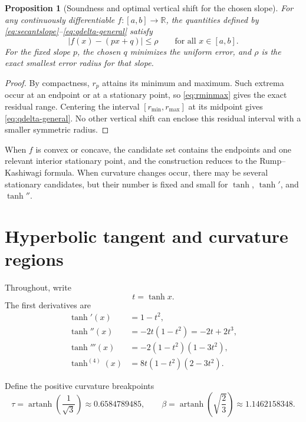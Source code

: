 \documentclass[11pt]{article}
\newtheorem{proposition}{Proposition}
\newcommand{\R}{\mathbb{R}}
\newcommand{\artanh}{\operatorname{artanh}}
\begin{document}
\begin{proposition}[Soundness and optimal vertical shift for the chosen slope]\label{prop:sound}
For any continuously differentiable \(f:[a,b]\to\R\), the quantities defined by \eqref{eq:secantslope}--\eqref{eq:qdelta-general} satisfy
\[
  |f(x)-(px+q)|\le \rho
  \qquad\text{for all }x\in[a,b].
\]
For the fixed slope \(p\), the chosen \(q\) minimizes the uniform error, and \(\rho\) is the exact smallest error radius for that slope.
\end{proposition}

\begin{proof}
By compactness, \(r_p\) attains its minimum and maximum. Such extrema occur at an endpoint or at a stationary point, so \eqref{eq:rminmax} gives the exact residual range. Centering the interval \([r_{\min},r_{\max}]\) at its midpoint gives \eqref{eq:qdelta-general}. No other vertical shift can enclose this residual interval with a smaller symmetric radius.
\end{proof}

When \(f\) is convex or concave, the candidate set contains the endpoints and one relevant interior stationary point, and the construction reduces to the Rump--Kashiwagi formula. When curvature changes occur, there may be several stationary candidates, but their number is fixed and small for \(\tanh\), \(\tanh'\), and \(\tanh''\).

\section{Hyperbolic tangent and curvature regions}

Throughout, write
\[
  t=\tanh x.
\]
The first derivatives are
\begin{align}
  \tanh'(x)&=1-t^2,\label{eq:tanh1}\\
  \tanh''(x)&=-2t(1-t^2)=-2t+2t^3,\label{eq:tanh2}\\
  \tanh'''(x)&=-2(1-t^2)(1-3t^2),\label{eq:tanh3}\\
  \tanh^{(4)}(x)&=8t(1-t^2)(2-3t^2).\label{eq:tanh4}
\end{align}

Define the positive curvature breakpoints
\begin{equation}\label{eq:alphabeta}
  \tau=\artanh\!\left(\frac{1}{\sqrt{3}}\right)
  \approx 0.6584789485,
  \qquad
  \beta=\artanh\!\left(\sqrt{\frac{2}{3}}\right)
  \approx 1.1462158348.
\end{equation}
\end{document}
